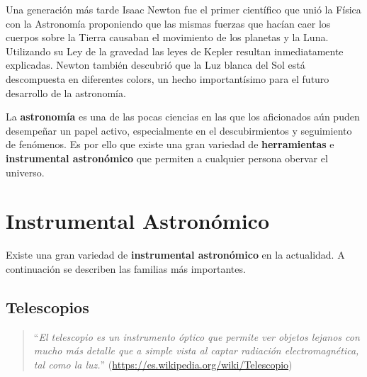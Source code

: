\bigskip
Una generación más tarde Isaac Newton fue el primer científico que unió la Física con la Astronomía proponiendo que las mismas fuerzas que hacían caer los cuerpos sobre la Tierra causaban el movimiento de los planetas y la Luna. Utilizando su Ley de la gravedad las leyes de Kepler resultan inmediatamente explicadas. Newton también descubrió que la Luz blanca del Sol está descompuesta en diferentes colors, un hecho importantísimo para el futuro desarrollo de la astronomía.

\bigskip
La \textbf{astronomía} es una de las pocas ciencias en las que los aficionados aún puden desempeñar un papel activo, especialmente en el descubirmientos y seguimiento de fenómenos. Es por ello que existe una gran variedad de \textbf{herramientas} e \textbf{instrumental astronómico} que permiten a cualquier persona obervar el universo.

\newpage
\section{Instrumental Astronómico}

Existe una gran variedad de \textbf{instrumental astronómico} en la actualidad. A continuación se describen las familias más importantes.

\subsection{Telescopios}

\begin{quote}``\textit{El telescopio es un instrumento óptico que permite ver objetos lejanos con mucho más detalle que a simple vista al captar radiación electromagnética, tal como la luz.}''
\newline(\url{https://es.wikipedia.org/wiki/Telescopio})
\end{quote}

